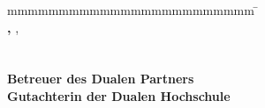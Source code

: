 \begin{titlepage}
\vfill

\flushleft
\begin{spacing}{1.2}
\begin{tabbing}
		mmmmmmmmmmmmmmmmmmmmmmmm              \= \kill
		\textbf{\langdbbearbeitungszeit} \> \zeitraum\\
		\textbf{\langdbmatriknr, \langdbkurs} \> \matrikelnr, \kurs\\
		\textbf{\langdbfirma} \> \firma\\
								\> \firmenort\\
		\textbf{Betreuer des Dualen Partners} \> \betreuer\\
		\textbf{Gutachterin der Dualen Hochschule}              \>  \gutachter\\
\end{tabbing}
\end{spacing}

\vspace{1cm}
\restoregeometry
\end{titlepage}